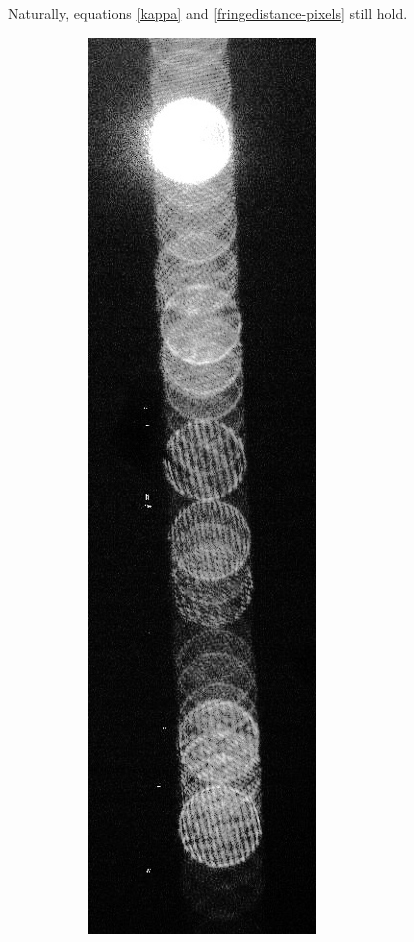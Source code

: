 \documentclass[11.5pt]{book}
\begin{document}
Naturally, equations \eqref{kappa} and \eqref{fringedistance-pixels} still hold.
\begin{figure}[h!]
    \centering
    \begin{subfigure}[b]{0.4\textwidth}
        \centering
        \includegraphics[height=0.6\textheight]{img/dots_cropped.jpg}
        \caption{}
    \end{subfigure}
    \begin{subfigure}[b]{0.4\textwidth}
        \centering

\end{subfigure}
\end{figure}
\end{document}
